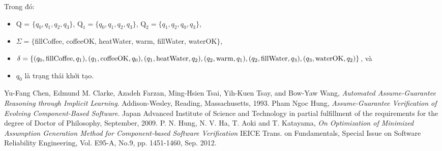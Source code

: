 \documentclass[a4paper,13pt,oneside,openany]{book}
\begin{document}
\begin{flushleft}
	Trong đó:
	\begin{itemize}
		\item Q = $\{q_0, q_1, q_2, q_3\}$, $\textrm{Q}_1 = \{q_0, q_1, q_2, q_3\}$, $\textrm{Q}_2 = \{q_1, q_2, q_0, q_3\}$,
		\item $\Sigma = \{$fillCoffee, coffeeOK, heatWater, warm, fillWater, waterOK$\}$,
		\item $\delta = \{(q_0, \textrm{fillCoffee}, q_1), (q_1, \textrm{coffeeOK}, q_0), (q_1, \textrm{heatWater}, q_2), (q_2, \textrm{warm}, q_1),\\ (q_2, \textrm{fillWater}, q_3), (q_3, \textrm{waterOK}, q_2)\}$, và
		\item $q_0$ là trạng thái khởi tạo.
	\end{itemize}
	\end{flushleft}
\begin{thebibliography}{9}
	Yu-Fang Chen, Edmund M. Clarke, Azadeh Farzan, Ming-Hsien Tsai,
	Yih-Kuen Tsay, and Bow-Yaw Wang, \textit{Automated Assume-Guarantee Reasoning
		through Implicit Learning}. 
	Addison-Wesley, Reading, Massachusetts, 1993.
	Pham Ngoc Hung, \textit{Assume-Guarantee Verification of Evolving Component-Based Software}.
	Japan Advanced Institute of Science and Technology in partial fulfillment of the requirements for the degree of Doctor of Philosophy, September, 2009.
	P. N. Hung, N. V.  Ha, T. Aoki and T. Katayama, \textit{On Optimization of Minimized Assumption Generation Method for Component-based Software Verification}
	IEICE Trans. on Fundamentals, Special Issue on Software Reliability Engineering, Vol. E95-A, No.9, pp. 1451-1460, Sep. 2012.
\end{thebibliography}
\end{document}
